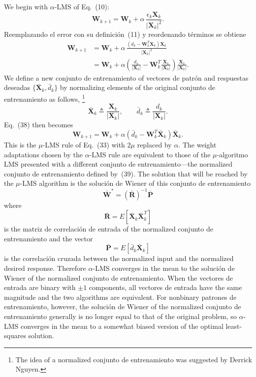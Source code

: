 \documentclass[10pt,twocolumn]{article}
\newcommand{\X}{\bm{X}}
\newcommand{\W}{\bm{W}}
\newcommand{\R}{\bm{R}}
\newcommand{\Pv}{\bm{P}}
\begin{document}
We begin with $\alpha$-LMS of Eq.~(10):
\begin{equation}
\W_{k+1} = \W_k + \alpha\,\frac{\epsilon_k\X_k}{|\X_k|^2}. \tag{36}
\end{equation}
Reemplazando el error con su definición~(11) y reordenando términos se obtiene
\begin{align}
\W_{k+1} &= \W_k + \alpha\,\frac{(d_k - \W_k^{T}\X_k)\X_k}{|\X_k|^2} \tag{37}\\
&= \W_k + \alpha\!\left(\frac{d_k}{|\X_k|} - \W_k^{T}\frac{\X_k}{|\X_k|}\right)\frac{\X_k}{|\X_k|}. \tag{38}
\end{align}
We define a new conjunto de entrenamiento of vectores de patrón and respuestas deseadas
$\{\bar{\X}_k, \bar{d}_k\}$ by normalizing elements of the original conjunto de entrenamiento as
follows,%
\footnote{The idea of a normalized conjunto de entrenamiento was suggested by Derrick Nguyen.}
\begin{equation}
\bar{\X}_k \triangleq \frac{\X_k}{|\X_k|}, \qquad
\bar{d}_k \triangleq \frac{d_k}{|\X_k|}. \tag{39}
\end{equation}
Eq.~(38) then becomes
\begin{equation}
\W_{k+1} = \W_k + \alpha(\bar{d}_k - \W_k^{T}\bar{\X}_k)\bar{\X}_k. \tag{40}
\end{equation}
This is the $\mu$-LMS rule of Eq.~(33) with $2\mu$ replaced by $\alpha$. The weight
adaptations chosen by the $\alpha$-LMS rule are equivalent to those of the
$\mu$-algoritmo LMS presented with a different conjunto de entrenamiento---the normalized
conjunto de entrenamiento defined by~(39). The solution that will be reached by the $\mu$-LMS
algorithm is the solución de Wiener of this conjunto de entrenamiento
\begin{equation}
\bar{\W}^{*} = (\bar{\R})^{-1}\bar{\Pv} \tag{41}
\end{equation}
where
\begin{equation}
\bar{\R} = E[\bar{\X}_k\bar{\X}_k^{T}] \tag{42}
\end{equation}
is the matriz de correlación de entrada of the normalized conjunto de entrenamiento and the vector
\begin{equation}
\bar{\Pv} = E[\bar{d}_k\bar{\X}_k] \tag{43}
\end{equation}
is the correlación cruzada between the normalized input and the normalized desired
response. Therefore $\alpha$-LMS converges in the mean to the solución de Wiener of
the normalized conjunto de entrenamiento. When the vectores de entrada are binary with $\pm 1$
components, all vectores de entrada have the same magnitude and the two algorithms are
equivalent. For nonbinary patrones de entrenamiento, however, the solución de Wiener of the
normalized conjunto de entrenamiento generally is no longer equal to that of the original
problem, so $\alpha$-LMS converges in the mean to a somewhat biased version of the
optimal least-squares solution.
\end{document}
